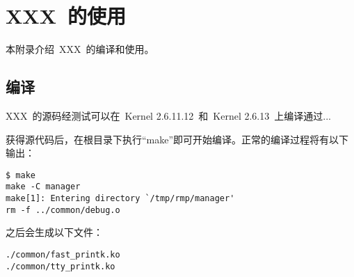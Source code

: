 \section{XXX~的使用}
\lstset{numbers=none}

本附录介绍~XXX~的编译和使用。

\subsection{编译}

XXX~的源码经测试可以在~Kernel 2.6.11.12~和~Kernel 2.6.13~上编译通过...

获得源代码后，在根目录下执行``make''即可开始编译。正常的编译过程将有以下输出：
\begin{sourcelist}\begin{verbatim}
$ make
make -C manager
make[1]: Entering directory `/tmp/rmp/manager'
rm -f ../common/debug.o
\end{verbatim}\end{sourcelist}

之后会生成以下文件：
\begin{sourcelist}\begin{verbatim}
./common/fast_printk.ko
./common/tty_printk.ko
\end{verbatim}\end{sourcelist}

